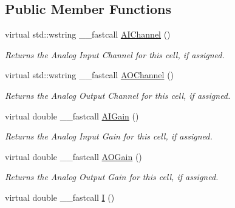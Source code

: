 \subsection*{Public Member Functions}
\begin{DoxyCompactItemize}
\item 
\hypertarget{class_t_cell_a21058e4555fbca0016550e81acfe85b7}{virtual std\+::wstring \+\_\+\+\_\+fastcall \hyperlink{class_t_cell_a21058e4555fbca0016550e81acfe85b7}{A\+I\+Channel} ()}\label{class_t_cell_a21058e4555fbca0016550e81acfe85b7}

\begin{DoxyCompactList}\small\item\em Returns the Analog Input Channel for this cell, if assigned. \end{DoxyCompactList}\item 
\hypertarget{class_t_cell_aff448a0cbbe96e528d59518b9cd20075}{virtual std\+::wstring \+\_\+\+\_\+fastcall \hyperlink{class_t_cell_aff448a0cbbe96e528d59518b9cd20075}{A\+O\+Channel} ()}\label{class_t_cell_aff448a0cbbe96e528d59518b9cd20075}

\begin{DoxyCompactList}\small\item\em Returns the Analog Output Channel for this cell, if assigned. \end{DoxyCompactList}\item 
\hypertarget{class_t_cell_a3a3f8f9d1da6b19cbb0e7faa9d8fe36b}{virtual double \+\_\+\+\_\+fastcall \hyperlink{class_t_cell_a3a3f8f9d1da6b19cbb0e7faa9d8fe36b}{A\+I\+Gain} ()}\label{class_t_cell_a3a3f8f9d1da6b19cbb0e7faa9d8fe36b}

\begin{DoxyCompactList}\small\item\em Returns the Analog Input Gain for this cell, if assigned. \end{DoxyCompactList}\item 
\hypertarget{class_t_cell_acacc3c2214db5f5593ad87d3255c0946}{virtual double \+\_\+\+\_\+fastcall \hyperlink{class_t_cell_acacc3c2214db5f5593ad87d3255c0946}{A\+O\+Gain} ()}\label{class_t_cell_acacc3c2214db5f5593ad87d3255c0946}

\begin{DoxyCompactList}\small\item\em Returns the Analog Output Gain for this cell, if assigned. \end{DoxyCompactList}\item 
\hypertarget{class_t_cell_a98c54f012c9f9b55294d3f055af7be33}{virtual double \+\_\+\+\_\+fastcall \hyperlink{class_t_cell_a98c54f012c9f9b55294d3f055af7be33}{I} ()}\label{class_t_cell_a98c54f012c9f9b55294d3f055af7be33}


\end{DoxyCompactItemize}

